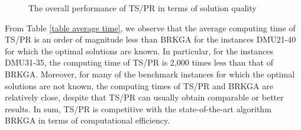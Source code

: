 \documentclass[authoryear,12pt]{elsarticle}
\begin{document}
\begin{figure*}[!h]
    \begin{center}
        \caption{The overall performance of TS/PR in terms of solution quality}\label{total solution quality}
    \end{center}
\end{figure*}


From Table \ref{table average time}, we observe that the average computing time of TS/PR is an order of magnitude less than BRKGA for the instances DMU21-40 for which the optimal solutions are known. In particular, for the instances DMU31-35, the computing time of TS/PR is 2,000 times less than that of BRKGA. Moreover, for many of the benchmark instances for which the optimal solutions are not known, the computing times of TS/PR and BRKGA are relatively close, despite that TS/PR can usually obtain comparable or better results. In sum, TS/PR is competitive with the state-of-the-art algorithm BRKGA in terms of computational efficiency.


\label{subsec Computational Results 1}
\end{document}
